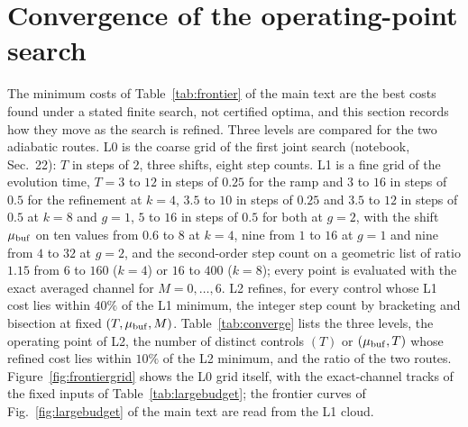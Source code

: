 \documentclass[aps,prc,reprint,superscriptaddress,floatfix,nofootinbib]{revtex4-2}
\begin{document}
\section{Convergence of the operating-point search}
\label{sm:converge}
The minimum costs of Table~\ref{tab:frontier} of the main text are the best
costs found under a stated finite search, not certified optima, and this
section records how they move as the search is refined.  Three levels are
compared for the two adiabatic routes.  L0 is the coarse grid of the first
joint search (notebook, Sec.~22): $T$ in steps of $2$, three shifts, eight
step counts.  L1 is a fine grid of the evolution time, $T=3$ to $12$ in
steps of $0.25$ for the ramp and $3$ to $16$ in steps of $0.5$ for the
refinement at $k=4$, $3.5$ to $10$ in steps of $0.25$ and $3.5$ to $12$ in
steps of $0.5$ at $k=8$ and $g=1$, $5$ to $16$ in steps of $0.5$ for both at
$g=2$, with the shift $\mu_{\rm buf}$ on ten values from $0.6$ to $8$ at
$k=4$, nine from $1$ to $16$ at $g=1$ and nine from $4$ to $32$ at $g=2$, and
the second-order step count on a geometric list of ratio $1.15$ from $6$ to
$160$ ($k=4$) or $16$ to $400$ ($k=8$); every point is evaluated with the
exact averaged channel for $M=0,\ldots,6$.  L2 refines, for every control
whose L1 cost lies within $40\%$ of the L1 minimum, the integer step count by
bracketing and bisection at fixed $(T,\mu_{\rm buf},M)$.  Table~\ref{tab:converge}
lists the three levels, the operating point of L2, the number of distinct
controls $(T)$ or $(\mu_{\rm buf},T)$ whose refined cost lies within $10\%$ of
the L2 minimum, and the ratio of the two routes.  Figure~\ref{fig:frontiergrid}
shows the L0 grid itself, with the exact-channel tracks of the fixed inputs
of Table~\ref{tab:largebudget}; the frontier curves of Fig.~\ref{fig:largebudget}
of the main text are read from the L1 cloud.
\end{document}
